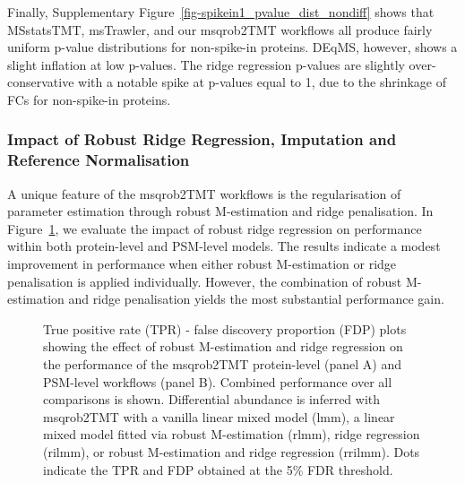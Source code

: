 \documentclass[
  letterpaper,
  DIV=11,
  numbers=noendperiod]{scrartcl}
\begin{document}
Finally, Supplementary Figure~\ref{fig-spikein1_pvalue_dist_nondiff}
shows that MSstatsTMT, msTrawler, and our msqrob2TMT workflows all
produce fairly uniform p-value distributions for non-spike-in proteins.
DEqMS, however, shows a slight inflation at low p-values. The ridge
regression p-values are slightly over-conservative with a notable spike
at p-values equal to 1, due to the shrinkage of FCs for non-spike-in
proteins.

\subsubsection{Impact of Robust Ridge Regression, Imputation and Reference Normalisation}

A unique feature of the msqrob2TMT workflows is the regularisation of
parameter estimation through robust M-estimation and ridge penalisation.
In Figure~\ref{fig-rrilmmComparisons}, we evaluate the impact of robust
ridge regression on performance within both protein-level and PSM-level
models. The results indicate a modest improvement in performance when
either robust M-estimation or ridge penalisation is applied
individually. However, the combination of robust M-estimation and ridge
penalisation yields the most substantial performance gain.

\begin{figure}[H]


\caption{\label{fig-rrilmmComparisons}True positive rate (TPR) - false
discovery proportion (FDP) plots showing the effect of robust
M-estimation and ridge regression on the performance of the msqrob2TMT
protein-level (panel A) and PSM-level workflows (panel B). Combined
performance over all comparisons is shown. Differential abundance is
inferred with msqrob2TMT with a vanilla linear mixed model (lmm), a
linear mixed model fitted via robust M-estimation (rlmm), ridge
regression (rilmm), or robust M-estimation and ridge regression
(rrilmm). Dots indicate the TPR and FDP obtained at the 5\% FDR
threshold.}

\end{figure}%
\end{document}
